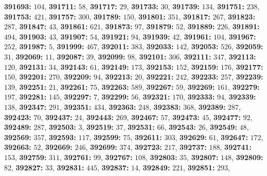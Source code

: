 \textsf{\bfseries 391693:} $104$, \textsf{\bfseries 391711:} $58$, \textsf{\bfseries 391717:} $29$, \textsf{\bfseries 391733:} $30$, \textsf{\bfseries 391739:} $134$, \textsf{\bfseries 391751:} $238$, \textsf{\bfseries 391753:} $421$, \textsf{\bfseries 391757:} $300$, \textsf{\bfseries 391789:} $150$, \textsf{\bfseries 391801:} $351$, \textsf{\bfseries 391817:} $267$, \textsf{\bfseries 391823:} $287$, \textsf{\bfseries 391847:} $43$, \textsf{\bfseries 391861:} $621$, \textsf{\bfseries 391873:} $97$, \textsf{\bfseries 391879:} $52$, \textsf{\bfseries 391889:} $226$, \textsf{\bfseries 391891:} $494$, \textsf{\bfseries 391903:} $43$, \textsf{\bfseries 391907:} $54$, \textsf{\bfseries 391921:} $94$, \textsf{\bfseries 391939:} $42$, \textsf{\bfseries 391961:} $104$, \textsf{\bfseries 391967:} $252$, \textsf{\bfseries 391987:} $5$, \textsf{\bfseries 391999:} $467$, \textsf{\bfseries 392011:} $383$, \textsf{\bfseries 392033:} $142$, \textsf{\bfseries 392053:} $526$, \textsf{\bfseries 392059:} $31$, \textsf{\bfseries 392069:} $11$, \textsf{\bfseries 392087:} $39$, \textsf{\bfseries 392099:} $98$, \textsf{\bfseries 392101:} $306$, \textsf{\bfseries 392111:} $347$, \textsf{\bfseries 392113:} $120$, \textsf{\bfseries 392131:} $34$, \textsf{\bfseries 392143:} $61$, \textsf{\bfseries 392149:} $173$, \textsf{\bfseries 392153:} $152$, \textsf{\bfseries 392159:} $176$, \textsf{\bfseries 392177:} $150$, \textsf{\bfseries 392201:} $270$, \textsf{\bfseries 392209:} $94$, \textsf{\bfseries 392213:} $20$, \textsf{\bfseries 392221:} $242$, \textsf{\bfseries 392233:} $257$, \textsf{\bfseries 392239:} $139$, \textsf{\bfseries 392251:} $21$, \textsf{\bfseries 392261:} $75$, \textsf{\bfseries 392263:} $589$, \textsf{\bfseries 392267:} $59$, \textsf{\bfseries 392269:} $161$, \textsf{\bfseries 392279:} $197$, \textsf{\bfseries 392281:} $145$, \textsf{\bfseries 392297:} $7$, \textsf{\bfseries 392299:} $56$, \textsf{\bfseries 392321:} $170$, \textsf{\bfseries 392333:} $94$, \textsf{\bfseries 392339:} $138$, \textsf{\bfseries 392347:} $291$, \textsf{\bfseries 392351:} $434$, \textsf{\bfseries 392363:} $248$, \textsf{\bfseries 392383:} $368$, \textsf{\bfseries 392389:} $287$, \textsf{\bfseries 392423:} $70$, \textsf{\bfseries 392437:} $24$, \textsf{\bfseries 392443:} $269$, \textsf{\bfseries 392467:} $57$, \textsf{\bfseries 392473:} $45$, \textsf{\bfseries 392477:} $92$, \textsf{\bfseries 392489:} $287$, \textsf{\bfseries 392503:} $3$, \textsf{\bfseries 392519:} $37$, \textsf{\bfseries 392531:} $66$, \textsf{\bfseries 392543:} $26$, \textsf{\bfseries 392549:} $48$, \textsf{\bfseries 392569:} $357$, \textsf{\bfseries 392593:} $117$, \textsf{\bfseries 392599:} $75$, \textsf{\bfseries 392611:} $303$, \textsf{\bfseries 392629:} $61$, \textsf{\bfseries 392647:} $172$, \textsf{\bfseries 392663:} $52$, \textsf{\bfseries 392669:} $246$, \textsf{\bfseries 392699:} $374$, \textsf{\bfseries 392723:} $217$, \textsf{\bfseries 392737:} $188$, \textsf{\bfseries 392741:} $153$, \textsf{\bfseries 392759:} $311$, \textsf{\bfseries 392761:} $99$, \textsf{\bfseries 392767:} $108$, \textsf{\bfseries 392803:} $35$, \textsf{\bfseries 392807:} $148$, \textsf{\bfseries 392809:} $82$, \textsf{\bfseries 392827:} $33$, \textsf{\bfseries 392831:} $445$, \textsf{\bfseries 392837:} $14$, \textsf{\bfseries 392849:} $221$, \textsf{\bfseries 392851:} $293$, 
